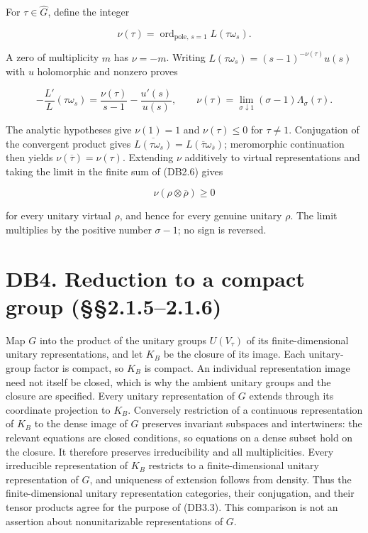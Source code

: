 \documentclass[
]{report}
\begin{document}
For \(\tau\in\widehat G\), define the integer

\[
 \nu(\tau)=\operatorname{ord}_{\text{pole},\,s=1}L(\tau\omega_s).
 \tag{DB3.1}
\]

A zero of multiplicity \(m\) has \(\nu=-m\). Writing
\(L(\tau\omega_s)=(s-1)^{-\nu(\tau)}u(s)\) with \(u\) holomorphic and
nonzero proves

\[
 -\frac{L'}L(\tau\omega_s)
  =\frac{\nu(\tau)}{s-1}-\frac{u'(s)}{u(s)},\qquad
 \nu(\tau)=\lim_{\sigma\downarrow1}(\sigma-1)\Lambda_\sigma(\tau).
 \tag{DB3.2}
\]

The analytic hypotheses give \(\nu(1)=1\) and \(\nu(\tau)\leq0\) for
\(\tau\ne1\). Conjugation of the convergent product gives
\(\overline{L(\tau\omega_s)}=L(\overline\tau\omega_{\overline s})\);
meromorphic continuation then yields \(\nu(\overline\tau)=\nu(\tau)\).
Extending \(\nu\) additively to virtual representations and taking the
limit in the finite sum of (DB2.6) gives

\[
 \nu(\rho\otimes\overline\rho)\geq0
 \tag{DB3.3}
\]

for every unitary virtual \(\rho\), and hence for every genuine unitary
\(\rho\). The limit multiplies by the positive number \(\sigma-1\); no
sign is reversed.

\section{DB4. Reduction to a compact group
(§§2.1.5--2.1.6)}\label{db4.-reduction-to-a-compact-group-2.1.52.1.6}

Map \(G\) into the product of the unitary groups \(U(V_\tau)\) of its
finite-dimensional unitary representations, and let \(K_B\) be the
closure of its image. Each unitary-group factor is compact, so \(K_B\)
is compact. An individual representation image need not itself be
closed, which is why the ambient unitary groups and the closure are
specified. Every unitary representation of \(G\) extends through its
coordinate projection to \(K_B\). Conversely restriction of a continuous
representation of \(K_B\) to the dense image of \(G\) preserves
invariant subspaces and intertwiners: the relevant equations are closed
conditions, so equations on a dense subset hold on the closure. It
therefore preserves irreducibility and all multiplicities. Every
irreducible representation of \(K_B\) restricts to a finite-dimensional
unitary representation of \(G\), and uniqueness of extension follows
from density. Thus the finite-dimensional unitary representation
categories, their conjugation, and their tensor products agree for the
purpose of (DB3.3). This comparison is not an assertion about
nonunitarizable representations of \(G\).
\end{document}
